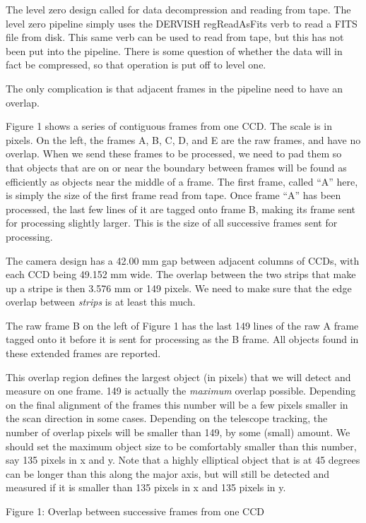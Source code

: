 The level zero design called for data decompression and reading from tape.
The level zero pipeline simply uses the DERVISH regReadAsFits verb to read
a FITS file from disk.  This same verb can be used to read from tape, but
this has not been put into the pipeline.  There is some question of whether
the data will in fact be compressed, so that operation is put off to level
one.

The only complication is that adjacent frames in the pipeline need to have 
an overlap.

Figure 1 shows a series of contiguous frames from one CCD.  The
scale is in pixels.  On the left, the frames A, B, C, D, and E
are the raw frames, and have no overlap.  When we send these frames
to be processed, we need to pad them so that objects that are on or
near the boundary between frames will be found as efficiently as
objects near the middle of a frame.
The first frame, called ``A'' here, 
is simply the size of the first frame read from tape.
Once frame ``A'' has been processed, the last few lines of it are
tagged onto frame B, making its frame sent for processing slightly larger.
This is the size of all successive frames sent for processing.

The camera design has a 42.00 mm gap between adjacent columns of CCDs,
with each CCD being 49.152 mm wide.  The overlap between the two strips
that make up a stripe is then 3.576 mm or 149 pixels.  We need to make
sure that the edge overlap between {\em strips} is at least this much.

The raw frame B on the left of Figure 1 has the last 149 lines of
the raw A frame tagged onto it before it is sent for processing
as the B frame.  All objects found in these extended frames are 
reported.

This overlap region defines the largest object (in pixels) that we will
detect and measure on one frame.  
149 is actually the {\em maximum} overlap possible.
Depending on the final alignment of the frames this number will be a few
pixels smaller in the scan direction in some cases.  Depending on the
telescope tracking, the number of overlap pixels will be smaller than
149, by some (small) amount.  We should set the maximum object size to
be comfortably smaller than this number, say 135 pixels in x and y.
Note that a highly elliptical object that is at 45 degrees can be longer
than this along the major axis, but will still be detected and measured
if it is smaller than 135 pixels in x and 135 pixels in y.

\textwidth
\vskip 0.25in

Figure 1:  Overlap between successive frames from one CCD

